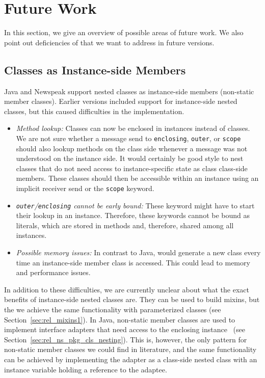 \chapter{Future Work}
\label{sec:future}
In this section, we give an overview of possible areas of future work. We also point out deficiencies of \msname that we want to address in future versions.

\section{Classes as Instance-side Members}
\label{sec:future_inst_side}
Java and Newspeak support nested classes as instance-side members (non-static member classes). Earlier versions \msname included support for instance-side nested classes, but this caused difficulties in the implementation. 

\begin{itemize}
	\item \emph{Method lookup:} Classes can now be enclosed in instances instead of classes. We are not sure whether a message send to \texttt{enclosing}, \texttt{outer}, or \texttt{scope} should also lookup methods on the class side whenever a message was not understood on the instance side. It would certainly be good style to nest classes that do not need access to instance-specific state as class class-side members. These classes should then be accessible within an instance using an implicit receiver send or the \texttt{scope} keyword.
	\item \emph{\texttt{outer}/\texttt{enclosing} cannot be early bound:} These keyword might have to start their lookup in an instance. Therefore, these keywords cannot be bound as literals, which are stored in methods and, therefore, shared among all instances.
	\item \emph{Possible memory issues:} In contrast to Java, \msname would generate a new class every time an instance-side member class is accessed. This could lead to memory and performance issues.
\end{itemize}

In addition to these difficulties, we are currently unclear about what the exact benefits of instance-side nested classes are. They can be used to build mixins, but the we achieve the same functionality with parameterized classes (see Section~\ref{sec:rel_mixins1}). In Java, non-static member classes are used to implement interface adapters that need access to the enclosing instance~\cite{Bloch:2008:EJ:1377533} (see Section~\ref{sec:rel_ns_pkg_cls_nesting}). This is, however, the only pattern for non-static member classes we could find in literature, and the same functionality can be achieved by implementing the adapter as a class-side nested class with an instance variable holding a reference to the adaptee.

